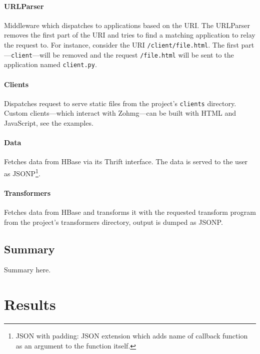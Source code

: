 \subsubsection{URLParser}

Middleware which dispatches to applications based on the URI. The URLParser
removes the first part of the URI and tries to find a matching application
to relay the request to. For instance, consider the URI
\texttt{/client/file.html}. The first part---\texttt{client}---will be
removed and the request \texttt{/file.html} will be sent to the application
named \texttt{client.py}.


\subsubsection{Clients}

Dispatches request to serve static files from the project's
\texttt{clients} directory. Custom clients---which interact with Zohmg---can
be built with HTML and JavaScript, see the examples.


\subsubsection{Data}

Fetches data from HBase via its Thrift interface. The data is served to the
user as JSONP\footnote{JSON with padding: JSON extension which adds name of
callback function as an argument to the function itself.}.


\subsubsection{Transformers}

Fetches data from HBase and transforms it with the requested transform
program from the project's transformers directory, output is
dumped as JSONP.


\section*{Summary}

Summary here.



\chapter{Results}



